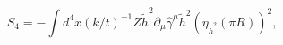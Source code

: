 \begin{equation}
  S_{4} = -\int d^{4}x
    (k/t)^{-1}Z\bar{\tilde{h}}^{2}\partial_{\mu}\hat{\gamma}^{\mu}
    \tilde{h}^{2}\left( \eta_{\tilde{h}^{2}}(\pi R) \right)^2,
\end{equation}


